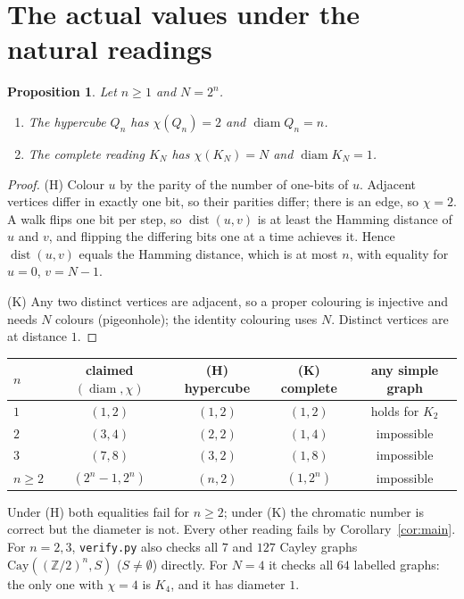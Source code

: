 \documentclass[11pt]{article}
\newtheorem{proposition}[theorem]{Proposition}
\theoremstyle{definition}
\theoremstyle{remark}
\begin{document}
\section{The actual values under the natural readings}
\begin{proposition}\label{prop:readings}
Let $n\ge1$ and $N=2^n$.
\begin{enumerate}
\item[(H)] The hypercube $Q_n$ has $\chi(Q_n)=2$ and $\operatorname{diam}Q_n=n$.
\item[(K)] The complete reading $K_N$ has $\chi(K_N)=N$ and
$\operatorname{diam}K_N=1$.
\end{enumerate}
\end{proposition}
\begin{proof}
(H) Colour $u$ by the parity of the number of one-bits of $u$. Adjacent vertices
differ in exactly one bit, so their parities differ; there is an edge, so
$\chi=2$. A walk flips one bit per step, so $\operatorname{dist}(u,v)$ is at least the
Hamming distance of $u$ and $v$, and flipping the differing bits one at a time
achieves it. Hence $\operatorname{dist}(u,v)$ equals the Hamming distance, which is at most $n$,
with equality for $u=0$, $v=N-1$.

(K) Any two distinct vertices are adjacent, so a proper colouring is injective
and needs $N$ colours (pigeonhole); the identity colouring uses $N$. Distinct
vertices are at distance $1$.
\end{proof}

\begin{center}
\begin{tabular}{@{}lcccc@{}}
\toprule
$n$ & claimed $(\operatorname{diam},\chi)$ & (H) hypercube & (K) complete & any simple graph\\
\midrule
$1$ & $(1,2)$ & $(1,2)$ & $(1,2)$ & holds for $K_2$\\
$2$ & $(3,4)$ & $(2,2)$ & $(1,4)$ & impossible\\
$3$ & $(7,8)$ & $(3,2)$ & $(1,8)$ & impossible\\
$n\ge2$ & $(2^n-1,2^n)$ & $(n,2)$ & $(1,2^n)$ & impossible\\
\bottomrule
\end{tabular}
\end{center}
Under (H) both equalities fail for $n\ge2$; under (K) the chromatic number is
correct but the diameter is not. Every other reading fails by
Corollary~\ref{cor:main}. For $n=2,3$, \texttt{verify.py} also checks all $7$
and $127$ Cayley graphs $\mathrm{Cay}((\mathbb Z/2)^n,S)$ ($S\ne\emptyset$)
directly. For $N=4$ it checks all $64$ labelled graphs: the only one with
$\chi=4$ is $K_4$, and it has diameter $1$.
\end{document}
